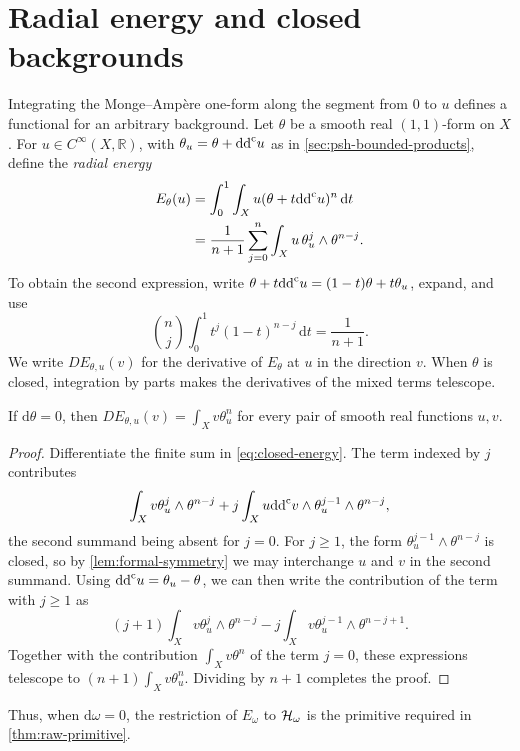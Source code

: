 \section{Radial energy and closed backgrounds}

Integrating the Monge--Amp\`ere one-form along the segment from $0$ to $u$ defines a functional for an arbitrary background. Let $\theta$ be a smooth real $(1,1)$-form on $X$. For $u\in C^\infty(X,\mathbb R)$, with $\theta_u=\theta+\mathrm{dd}^{\mathrm{c}} u$ as in \cref{sec:psh-bounded-products}, define the \emph{radial energy}
\begin{equation}\label{eq:closed-energy}
 \begin{aligned}
 E_\theta(u)
 &=\int_0^1\int_Xu(\theta+t\mathrm{dd}^{\mathrm{c}} u)^n\,\mathrm{d}t\\
 &=\frac1{n+1}\sum_{j=0}^n
       \int_Xu\,\theta_u^j\wedge\theta^{n-j}.
 \end{aligned}
\end{equation}
To obtain the second expression, write $\theta+t\mathrm{dd}^{\mathrm{c}} u=(1-t)\theta+t\theta_u$, expand, and use
\[
 \binom nj\int_0^1t^j(1-t)^{n-j}\,\mathrm dt=\frac1{n+1}.
\]
We write $DE_{\theta,u}(v)$ for the derivative of $E_\theta$ at $u$ in the direction $v$. When $\theta$ is closed, integration by parts makes the derivatives of the mixed terms telescope.

\begin{proposition}\label{prop:closed-energy}
If $\mathrm d\theta=0$, then $DE_{\theta,u}(v)=\int_Xv\theta_u^n$ for every pair of smooth real functions $u,v$.
\end{proposition}
\begin{proof}
Differentiate the finite sum in \eqref{eq:closed-energy}. The term indexed by $j$ contributes
\[
 \int_Xv\theta_u^j\wedge\theta^{n-j}
 +j\int_Xu\mathrm{dd}^{\mathrm{c}} v\wedge\theta_u^{j-1}\wedge\theta^{n-j},
\]
the second summand being absent for $j=0$. For $j\geq1$, the form $\theta_u^{j-1}\wedge\theta^{n-j}$ is closed, so by \cref{lem:formal-symmetry} we may interchange $u$ and $v$ in the second summand. Using $\mathrm{dd}^{\mathrm{c}} u=\theta_u-\theta$, we can then write the contribution of the term with $j\geq1$ as
\[
 (j+1)\int_Xv\theta_u^j\wedge\theta^{n-j}
 -j\int_Xv\theta_u^{j-1}\wedge\theta^{n-j+1}.
\]
Together with the contribution $\int_Xv\theta^n$ of the term $j=0$, these expressions telescope to $(n+1)\int_Xv\theta_u^n$. Dividing by $n+1$ completes the proof.
\end{proof}

Thus, when $\mathrm d\omega=0$, the restriction of $E_\omega$ to $\mathcal H_\omega$ is the primitive required in \cref{thm:raw-primitive}.

